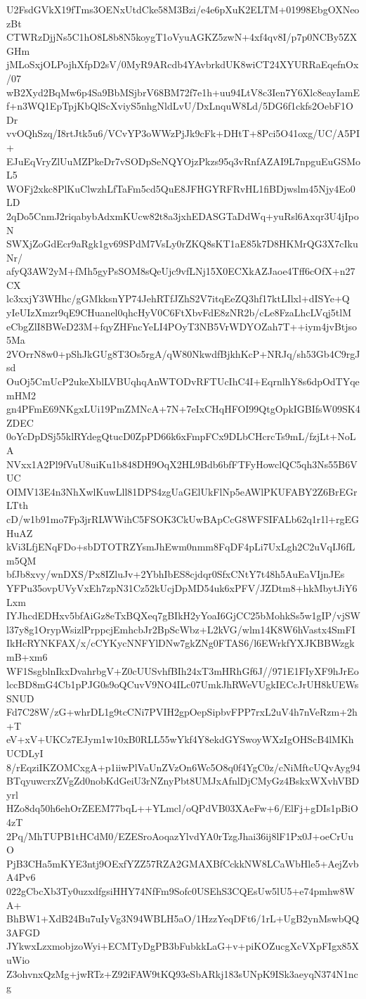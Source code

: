 U2FsdGVkX19fTms3OENxUtdCke58M3Bzi/e4e6pXuK2ELTM+01998EbgOXNeozBt
CTWRzDjjNs5C1hO8L8b8N5koygT1oVyuAGKZ5zwN+4xf4qv8I/p7p0NCBy5ZXGHm
jMLoSxjOLPojhXfpD2sV/0MyR9ARcdb4YAvbrkdUK8wiCT24XYURRaEqefnOx/07
wB2Xyd2BqMw6p4Sa9BbMSjbrV68BM72f7e1h+uu94LtV8c3Ien7Y6Xlc8eayIamE
f+n3WQ1EpTpjKbQlScXviyS5nhgNldLvU/DxLnquW8Ld/5DG6f1ckfs2OebF1ODr
vvOQhSzq/I8rtJtk5u6/VCvYP3oWWzPjJk9cFk+DHtT+8Pci5O41oxg/UC/A5PI+
EJuEqVryZlUuMZPkeDr7vSODpSeNQYOjzPkzs95q3vRnfAZAI9L7npguEuGSMoL5
WOFj2xkc8PlKuClwzhLfTaFm5cd5QuE8JFHGYRFRvHL1fiBDjwslm45Njy4Eo0LD
2qDo5CnmJ2riqabybAdxmKUcw82t8a3jxhEDASGTaDdWq+yuRsl6Axqr3U4jIpoN
SWXjZoGdEcr9aRgk1gv69SPdM7VsLy0rZKQ8sKT1aE85k7D8HKMrQG3X7cIkuNr/
afyQ3AW2yM+fMh5gyPsSOM8sQeUjc9vfLNj15X0ECXkAZJaoe4Tff6cOfX+n27CX
lc3xxjY3WHhc/gGMkksnYP74JehRTfJZhS2V7itqEeZQ3hf17ktLIlxl+dISYe+Q
yIeUIzXmzr9qE9CHuanel0qhcHyV0C6FtXbvFdE8zNR2b/cLe8FzaLhcLVqj5tlM
eCbgZlI8BWeD23M+fqyZHFncYeLI4POyT3NB5VrWDYOZah7T++iym4jvBtjso5Ma
2VOrrN8w0+pShJkGUg8T3Os5rgA/qW80NkwdfBjkhKcP+NRJq/sh53Gb4C9rgJsd
OuOj5CmUcP2ukeXblLVBUqhqAnWTODvRFTUcIhC4I+EqrnlhY8s6dpOdTYqemHM2
gn4PFmE69NKgxLUi19PmZMNcA+7N+7eIxCHqHFOI99QtgOpkIGBIfsW09SK4ZDEC
0oYcDpDSj55klRYdegQtucD0ZpPD66k6xFmpFCx9DLbCHcrcTs9mL/fzjLt+NoLA
NVxx1A2Pl9fVuU8uiKu1b848DH9OqX2HL9Bdb6bfFTFyHowclQC5qh3Ns55B6VUC
OIMV13E4n3NhXwlKuwLll81DPS4zgUaGElUkFlNp5eAWlPKUFABY2Z6BrEGrLTth
cD/w1b91mo7Fp3jrRLWWihC5FSOK3CkUwBApCcG8WFSIFALb62q1r1l+rgEGHuAZ
kVi3LfjENqFDo+sbDTOTRZYsmJhEwm0nmm8FqDF4pLi7UxLgh2C2uVqIJ6fLm5QM
bfJb8xvy/wnDXS/Px8IZluJv+2YbhIbES8cjdqr0SfxCNtY7t48h5AuEaVIjnJEs
YFPu35ovpUVyVxEh7zpN31Cz52kUcjDpMD54uk6xPFV/JZDtm8+hkMbytJiY6Lxm
IYJhcdEDHxv5bfAiGz8eTxBQXeq7gBIkH2yYoaI6GjCC25bMohkSs5w1gIP/vjSW
l37y8g1OrypWsizlPrppcjEmhcbJr2BpScWbz+L2kVG/wlm14K8W6hVastx4SmFI
IkHcRYNKFAX/x/cCYKycNNFYlDNw7gkZNg0FTAS6/l6EWrkfYXJKBBWzgkmB+xm6
WF1SsgblnIkxDvahrbgV+Z0cUUSvhfBIh24xT3mHRhGf6J//971E1FIyXF9hJrEo
lccBD8mG4Cb1pPJG0s9oQCuvV9NO4ILc07UmkJhRWeVUgkIECcJrUH8kUEWsSNUD
Fd7C28W/zG+whrDL1g9tcCNi7PVIH2gpOepSipbvFPP7rxL2uV4h7nVeRzm+2h+T
eV+xV+UKCz7EJym1w10xB0RLL55wYkf4Y8ekdGYSwoyWXzIgOHScB4lMKhUCDLyI
8/rEqziIKZOMCxgA+p1iiwPlVaUnZVzOn6Wc5O8q0f4YgC0z/cNiMftcUQvAyg94
BTqyuwcrxZVgZd0nobKdGeiU3rNZnyPbt8UMJxAfnlDjCMyGz4BskxWXvhVBDyrl
HZo8dq50h6ehOrZEEM77bqL++YLmcl/oQPdVB03XAeFw+6/ElFj+gDIs1pBiO4zT
2Pq/MhTUPB1tHCdM0/EZESroAoqazYlvdYA0rTzgJhai36ij8lF1Px0J+oeCrUuO
PjB3CHa5mKYE3ntj9OExfYZZ57RZA2GMAXBfCckkNW8LCaWbHle5+AejZvbA4Pv6
022gCbcXb3Ty0uzxdfgsiHHY74NfFm9Sofc0USEhS3CQEsUw5lU5+e74pmhw8WA+
BhBW1+XdB24Bu7uIyVg3N94WBLH5aO/1HzzYeqDFt6/1rL+UgB2ynMswbQQ3AFGD
JYkwxLzxmobjzoWyi+ECMTyDgPB3bFubkkLaG+v+piKOZucgXcVXpFIgx85XuWio
Z3ohvnxQzMg+jwRTz+Z92iFAW9tKQ93eSbARkj183sUNpK9ISk3aeyqN374N1ncg
